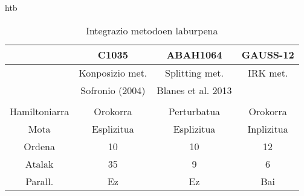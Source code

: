 \begin{table}{htb}
\caption{Integrazio metodoen laburpena}
\label{tab:1}       %
\begin{tabular}{ c|c c c } 
           &  C1035             &  ABAH1064           & GAUSS-12           \\
 \hline
 	       & Konposizio met.    & Splitting met.     & IRK met.            \\
 	       & Sofronio (2004)    & Blanes et al. 2013 &                     \\
 \hline 
               &                    &                    &                 \\
 Hamiltoniarra & Orokorra           & Perturbatua        & Orokorra        \\ 	    
 Mota          & Esplizitua         & Esplizitua         & Inplizitua      \\ 
 Ordena        & 10                 & 10                 & 12              \\ 
 Atalak        & 35                 & 9                  & 6               \\ 
 Parall.       & Ez                 & Ez                 & Bai             \\  
\end{tabular}
\end{table}
 

